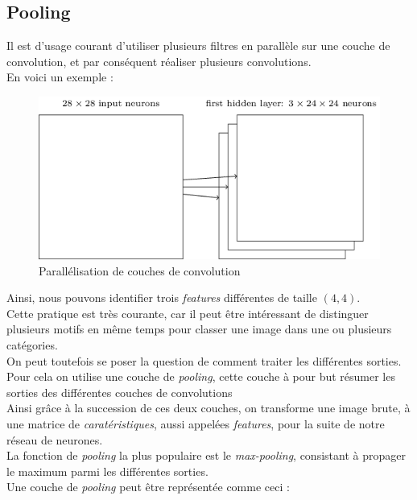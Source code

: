 \documentclass[10pt,a4paper]{report}
\begin{document}
		\subsection{Pooling}
		Il est d'usage courant d'utiliser plusieurs filtres en parallèle sur une couche de convolution, et par conséquent réaliser plusieurs convolutions.\\
		En voici un exemple :
		\begin{figure}[H]
			\begin{center}
				\includegraphics[scale=0.6]{Images/convolutionlayers.png}
				\caption{Parallélisation de couches de convolution}
			\end{center}
		\end{figure}
		Ainsi, nous pouvons identifier trois \emph{features} différentes de taille $(4,4)$.\\
		Cette pratique est très courante, car il peut être intéressant de distinguer plusieurs motifs en même temps pour classer une image dans une ou plusieurs catégories.\\
		On peut toutefois se poser la question de comment traiter les différentes sorties.\\
		Pour cela on utilise une couche de \emph{pooling}, cette couche à pour but résumer les sorties des différentes couches de convolutions\\
		Ainsi grâce à la succession de ces deux couches, on transforme une image brute, à une matrice de \emph{caratéristiques}, aussi appelées \emph{features}, pour la suite de notre réseau de neurones.\\
		La fonction de \emph{pooling} la plus populaire est le \emph{max-pooling}, consistant à propager le maximum parmi les différentes sorties.\\
		Une couche de \emph{pooling} peut être représentée comme ceci :
\end{document}
